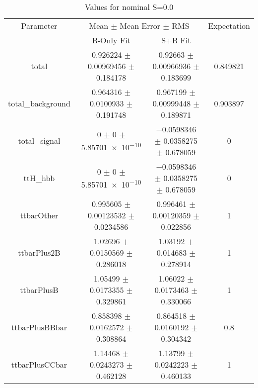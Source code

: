 \begin{table}
\centering
\caption{Values for nominal S=0.0}
\begin{tabular}{cccc}
\toprule
Parameter & \multicolumn{2}{c}{Mean $\pm$ Mean Error $\pm$ RMS} & Expectation\\
 & B-Only Fit & S+B Fit & \\
\midrule
total & \num{0.926224} $\pm$ \num{0.00969456} $\pm$ \num{0.184178} & \num{0.92663} $\pm$ \num{0.00966936} $\pm$ \num{0.183699} & \num{0.849821}\\
total\_background & \num{0.964316} $\pm$ \num{0.0100933} $\pm$ \num{0.191748} & \num{0.967199} $\pm$ \num{0.00999448} $\pm$ \num{0.189871} & \num{0.903897}\\
total\_signal & \num{0} $\pm$ \num{0} $\pm$ \num{5.85701e-10} & \num{-0.0598346} $\pm$ \num{0.0358275} $\pm$ \num{0.678059} & \num{0}\\
ttH\_hbb & \num{0} $\pm$ \num{0} $\pm$ \num{5.85701e-10} & \num{-0.0598346} $\pm$ \num{0.0358275} $\pm$ \num{0.678059} & \num{0}\\
ttbarOther & \num{0.995605} $\pm$ \num{0.00123532} $\pm$ \num{0.0234586} & \num{0.996461} $\pm$ \num{0.00120359} $\pm$ \num{0.022856} & \num{1}\\
ttbarPlus2B & \num{1.02696} $\pm$ \num{0.0150569} $\pm$ \num{0.286018} & \num{1.03192} $\pm$ \num{0.014683} $\pm$ \num{0.278914} & \num{1}\\
ttbarPlusB & \num{1.05499} $\pm$ \num{0.0173355} $\pm$ \num{0.329861} & \num{1.06022} $\pm$ \num{0.0173463} $\pm$ \num{0.330066} & \num{1}\\
ttbarPlusBBbar & \num{0.858398} $\pm$ \num{0.0162572} $\pm$ \num{0.308864} & \num{0.864518} $\pm$ \num{0.0160192} $\pm$ \num{0.304342} & \num{0.8}\\
ttbarPlusCCbar & \num{1.14468} $\pm$ \num{0.0243273} $\pm$ \num{0.462128} & \num{1.13799} $\pm$ \num{0.0242223} $\pm$ \num{0.460133} & \num{1}\\
\bottomrule
\end{tabular}
\end{table}